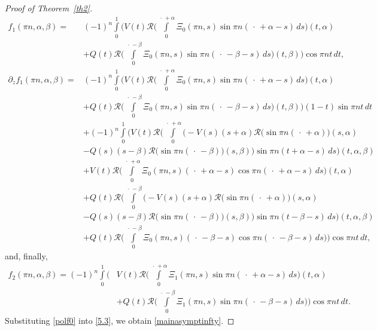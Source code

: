 \documentclass[10pt, a4paper]{article}
\theoremstyle{plain}
\theoremstyle{definition}
\numberwithin{equation}{section}
\def\a{\alpha}
\def\b{\beta}
\begin{document}
\begin{proof}[Proof of Theorem~\ref{th2}]
\begin{equation}
\begin{aligned}
f_1(\pi n,\a,\b) = &(-1)^n\int\limits_0^1\Bigg(V(t)\mathcal{R}\bigg(\int\limits_0^{\,\cdot\,+\alpha}
\Xi_0(\pi n, s)\sin \pi n(\,\cdot\,+\alpha-s)\,ds\bigg)(t,\a) \\
& +Q(t)\mathcal{R} \bigg(\int\limits_0^{\,\cdot\,-\beta}\Xi_0(\pi n, s)\sin \pi n(\,\cdot\,-\beta-s)\,ds\bigg)(t,\beta)\Bigg)\cos \pi nt\,dt,\\
 \partial_z f_1(\pi n,\a,\b)= &(-1)^n\int\limits_0^1\Bigg(V(t)\mathcal{R}\bigg(\int\limits_0^{\,\cdot\,+\alpha}
\Xi_0(\pi n, s)\sin \pi n(\,\cdot\,+\alpha-s)\,ds\bigg)(t,\a) \\
& +Q(t)\mathcal{R}\bigg(\int\limits_0^{\,\cdot\,-\beta}\Xi_0(\pi n, s)\sin \pi n(\,\cdot\,-\beta-s)\,ds\bigg)(t,\b)\Bigg)(1-t)\sin\pi nt\,dt \\
& +(-1)^n\int\limits_0^1\Bigg(V(t)\mathcal{R} \bigg(\int\limits_0^{\,\cdot\,+\alpha}\Big(-V(s)(s+\alpha)\mathcal{R}\big(\sin \pi n(\,\cdot\,+\alpha)\big)(s,\a) \\
& -Q(s)(s-\beta)\mathcal{R}\big(\sin \pi n(\,\cdot\,-\beta)\big)(s,\beta)\Big)\sin \pi n(t+\alpha-s)\,ds\bigg)(t,\a,\b) \\
& +V(t)\mathcal{R}\bigg(\int\limits_0^{\,\cdot\,+\alpha}\Xi_0(\pi n, s)(\,\cdot\,+\alpha-s)\cos \pi n(\,\cdot\,+\alpha-s)\,ds\bigg)(t,\a) \\
& +Q(t)\mathcal{R}\bigg(\int\limits_0^{\,\cdot\,-\beta} \Big(-V(s)(s+\alpha)\mathcal{R}\big(\sin \pi n(\,\cdot\,+\alpha)\big)(s,\a) \\
& -Q(s)(s-\beta)\mathcal{R}\big(\sin \pi n(\,\cdot\,-\beta)\big)(s,\b)\Big)\sin \pi n(t-\beta-s)\,ds\bigg)(t,\a,\b) \\
& +Q(t)\mathcal{R}\bigg(\int\limits_0^{\,\cdot\,-\beta}\Xi_0(\pi n, s)(\,\cdot\,-\beta-s)\cos \pi n(\,\cdot\,-\beta-s)\,ds\bigg)\Bigg)\cos \pi nt\,dt,
\end{aligned}
\end{equation}
and, finally,
\begin{equation}\label{polf2}
\begin{aligned}
f_2(\pi n,\a,\b)
=(-1)^n\int\limits_0^1\Bigg(&V(t)\mathcal{R}\bigg(\int\limits_0^{\,\cdot\,+\alpha} \Xi_1(\pi n, s)\sin \pi n(\,\cdot\,+\alpha-s)\,ds\bigg)(t,\a)
\\
& +Q(t)\mathcal{R}\bigg(\int\limits_0^{\,\cdot\,-\beta}\Xi_1(\pi n, s)\sin \pi n(\,\cdot\,-\beta-s)\,ds\bigg)\Bigg)\cos \pi nt\,dt.
\end{aligned}
\end{equation}
Substituting \eqref{polf0} into \eqref{5.3}, we obtain \eqref{mainasymptinfty}.


\end{proof}
\end{document}
